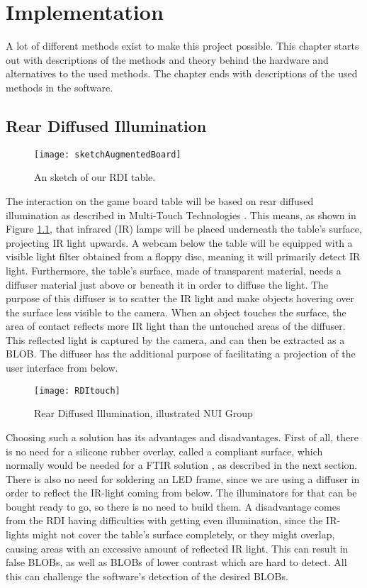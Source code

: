 
\chapter{Implementation}\label{ch:implementation}
A lot of different methods exist to make this project possible. This chapter starts out with descriptions of the methods and theory behind the hardware and alternatives to the used methods. The chapter ends with descriptions of the used methods in the software. 


\section{Rear Diffused Illumination} \label{sec:RDI}
\begin{figure}[!h]
\centering	\texttt{[image: sketchAugmentedBoard]}
 \caption{An sketch of our RDI table.\label{Fig:sketch}}
\end{figure}
The interaction on the game board table will be based on rear diffused illumination as described in Multi-Touch Technologies \citep{multiTT}. This means, as shown in Figure \ref{Fig:sketch}, that infrared (IR) lamps will be placed underneath the table's surface, projecting IR light upwards. A webcam below the table will be equipped with a visible light filter obtained from a floppy disc, meaning it will primarily detect IR light. Furthermore, the table's surface, made of transparent material, needs a diffuser material just above or beneath it in order to diffuse the light. The purpose of this diffuser is to scatter the IR light and make objects hovering over the surface less visible to the camera. When an object touches the surface, the area of contact reflects more IR light than the untouched areas of the diffuser. This reflected light is captured by the camera, and can then be extracted as a BLOB. The diffuser has the additional purpose of facilitating a projection of the user interface from below.

\begin{figure}[!h]
\centering	\texttt{[image: RDItouch]}
 \caption{Rear Diffused Illumination, illustrated NUI Group \citep{multiTT}\label{Fig:RDI}}
\end{figure}

Choosing such a solution has its advantages and disadvantages. First of all, there is no need for a silicone rubber overlay, called a compliant surface, which normally would be needed for a FTIR solution \citep{multiTT}, as described in the next section. There is also no need for soldering an LED frame, since we are using a diffuser in order to reflect the IR-light coming from below. The illuminators for that can be bought ready to go, so there is no need to build them. A disadvantage comes from the RDI having difficulties with getting even illumination, since the IR-lights might not cover the table's surface completely, or they might overlap, causing areas with an excessive amount of reflected IR light. This can result in false BLOBs, as well as BLOBs of lower contrast which are hard to detect. All this can challenge the software's detection of the desired BLOBs.

